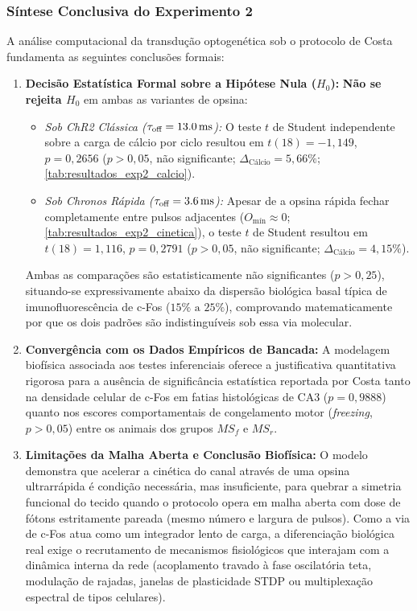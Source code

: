 \documentclass[11pt,a4paper,article,brazil]{abntex2}
\begin{document}
\subsubsection{Síntese Conclusiva do Experimento 2}
A análise computacional da transdução optogenética sob o protocolo de Costa \cite{costa2026} fundamenta as seguintes conclusões formais:
\begin{enumerate}
    \item \textbf{Decisão Estatística Formal sobre a Hipótese Nula ($H_0$):} \textbf{Não se rejeita $H_0$} em ambas as variantes de opsina:
          \begin{itemize}
              \item \emph{Sob ChR2 Clássica ($\tau_{\text{off}} = \qty{13{,}0}{\milli\second}$):} O teste $t$ de Student independente sobre a carga de cálcio por ciclo resultou em $t(18) = -1{,}149$, $p = 0{,}2656$ ($p > 0{,}05$, não significante; $\Delta_{\text{Cálcio}} = 5{,}66\%$; \cref{tab:resultados_exp2_calcio}).
              \item \emph{Sob Chronos Rápida ($\tau_{\text{off}} = \qty{3{,}6}{\milli\second}$):} Apesar de a opsina rápida fechar completamente entre pulsos adjacentes ($O_{\text{mín}} \approx 0$; \cref{tab:resultados_exp2_cinetica}), o teste $t$ de Student resultou em $t(18) = 1{,}116$, $p = 0{,}2791$ ($p > 0{,}05$, não significante; $\Delta_{\text{Cálcio}} = 4{,}15\%$).
          \end{itemize}
          Ambas as comparações são estatisticamente não significantes ($p > 0{,}25$), situando-se expressivamente abaixo da dispersão biológica basal típica de imunofluorescência de c-Fos ($15\%\text{ a }25\%$), comprovando matematicamente por que os dois padrões são indistinguíveis sob essa via molecular.
    \item \textbf{Convergência com os Dados Empíricos de Bancada:} A modelagem biofísica associada aos testes inferenciais oferece a justificativa quantitativa rigorosa para a ausência de significância estatística reportada por Costa \cite{costa2026} tanto na densidade celular de c-Fos em fatias histológicas de CA3 ($p = 0{,}9888$) quanto nos escores comportamentais de congelamento motor (\emph{freezing}, $p > 0{,}05$) entre os animais dos grupos $MS_f$ e $MS_r$.
    \item \textbf{Limitações da Malha Aberta e Conclusão Biofísica:} O modelo demonstra que acelerar a cinética do canal através de uma opsina ultrarrápida é condição necessária, mas insuficiente, para quebrar a simetria funcional do tecido quando o protocolo opera em malha aberta com dose de fótons estritamente pareada (mesmo número e largura de pulsos). Como a via de c-Fos atua como um integrador lento de carga, a diferenciação biológica real exige o recrutamento de mecanismos fisiológicos que interajam com a dinâmica interna da rede (acoplamento travado à fase oscilatória teta, modulação de rajadas, janelas de plasticidade STDP ou multiplexação espectral de tipos celulares).
\end{enumerate}
\end{document}
